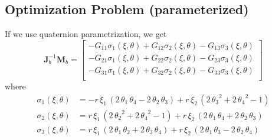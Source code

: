 \subsection{Optimization Problem (parameterized)}
If we use quaternion parametrization, we get
\begin{equation}
\mathbf{J}_b^{-1}\mathbf{M}_b = 
\left[\begin{array}{c}
-G_{11} \sigma_1(\xi,\theta) + G_{12} \sigma_2(\xi,\theta) - G_{13} \sigma_3(\xi,\theta) \\
-G_{21} \sigma_1(\xi,\theta) + G_{22} \sigma_2(\xi,\theta) - G_{23} \sigma_3(\xi,\theta) \\
-G_{31} \sigma_1(\xi,\theta) + G_{32} \sigma_2(\xi,\theta) - G_{33} \sigma_3(\xi,\theta) \\
\end{array}\right]
\end{equation}
where
\begin{align*}
\sigma_1(\xi,\theta) &= - r\, {\xi_1}\, \left(2\, {\theta_1}\, {\theta_4} - 2\, {\theta_2}\, {\theta_3}\right) + r\, {\xi_2}\, \left(2\, {{\theta_3}}^2 + 2\, {{\theta_4}}^2 - 1\right) \\
\sigma_2(\xi,\theta) &= r\, {\xi_1}\, \left(2\, {{\theta_2}}^2 + 2\, {{\theta_4}}^2 - 1\right) + r\, {\xi_2}\, \left(2\, {\theta_1}\, {\theta_4} + 2\, {\theta_2}\, {\theta_3}\right) \\
\sigma_3(\xi,\theta) &= r\, {\xi_1}\, \left(2\, {\theta_1}\, {\theta_2} + 2\, {\theta_3}\, {\theta_4}\right) + r\, {\xi_2}\, \left(2\, {\theta_1}\, {\theta_3} - 2\, {\theta_2}\, {\theta_4}\right)
\end{align*}